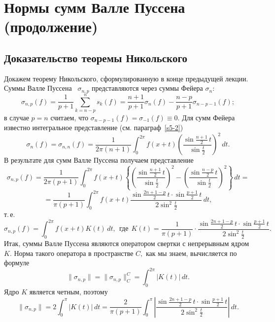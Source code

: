
 \chapter{Нормы сумм Валле Пуссена (продолжение)}

 \section{Доказательство теоремы Никольского}


Докажем  теорему Никольского, сформулированную в конце предыдущей лекции. Суммы
 Валле Пуссена%
 \ $\sigma_{n,p}$  представляются  через суммы Фейера $\sigma_n$:
  $$
 \sigma_{n,p}(f)=\frac{1}{p+1} \sum\limits_{k=n-p}^n s_k(f)=\frac{n+1}{p+1}
 \sigma_n(f)-\frac{n-p}{p+1} \sigma_{n-p-1}(f);
 $$
 в случае  $p=n$ считаем, что  $\sigma_{n-p-1}(f)=\sigma_{-1}(f)\equiv 0.$
 Для сумм Фейера известно интегральное представление (см. параграф~\ref{s5-2})
 $$
 \sigma_{n}(f)=\sigma_{n,n}(f)=
 \frac{1}{2\pi(n+1)} \int_0^{2\pi} f(x+t)\left( \frac{\sin
 \frac{n+1}{2}\,t}{\sin \frac{t}{2}}\right)^2\, dt.
 $$
 В результате для сумм Валле Пуссена получаем представление
 $$
 \sigma_{n,p}(f)=
 \frac{1}{2\pi(p+1)} \int_0^{2\pi} f(x+t)\left\{
 \left( \frac{\sin \frac{n+1}{2}\,t}{\sin \frac{t}{2}}\right)^2-
 \left( \frac{\sin \frac{n-p}{2}\,t}{\sin \frac{t}{2}}\right)^2\right\}\,
 dt=
 $$
 $$
 =\frac{1}{\pi(p+1)} \int_0^{2\pi} f(x+t)
 \frac{\sin \frac{2n+1-p}{2}\,t\cdot \sin \frac{p+1}{2}\,t}
 {2\sin^2 \frac{t}{2}}\, dt,
 $$
 т.\,е.
 $$
 \sigma_{n,p}(f)=\int_0^{2\pi} f(x+t)K(t)\, dt,\ \ \mbox{где}\ \  K(t)=\frac{1}{\pi(p+1)} \cdot
 \frac{\sin \frac{2n+1-p}{2}\,t\cdot \sin \frac{p+1}{2}\,t}
 {2\sin^2 \frac{t}{2}}.
 $$
Итак, суммы Валле Пуссена являются оператором свертки
 с непрерывным ядром  $K.$
 Норма такого оператора в пространстве $C,$ как мы знаем, вычисляется по формуле
 $$
 \|\sigma_{n,p}\|=\|\sigma_{n,p}\|_C^C=\int_0^{2\pi} |K(t)|\, dt.
 $$
Ядро $K$ является четным, поэтому
 $$
 \|\sigma_{n,p}\|=2\int_0^{\pi} |K(t)|\, dt=
 \frac{2}{\pi(p+1)} \int_0^{\pi}
 \left| \frac{\sin \frac{2n+1-p}{2}\,t\cdot \sin\frac{p+1}{2}\,t}
 {2\sin^2\frac{t}{2}} \right|\, dt.
 $$

